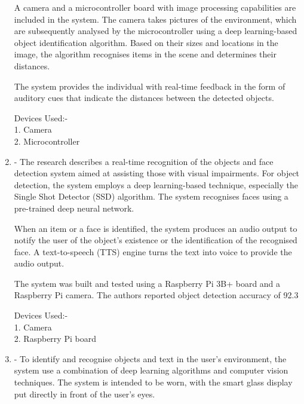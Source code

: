 \documentclass[MScCS]{uccthesis}
\begin{document}
\begin{enumerate}
A camera and a microcontroller board with image processing capabilities are included in the system. The camera takes pictures of the environment, which are subsequently analysed by the microcontroller using a deep learning-based object identification algorithm. Based on their sizes and locations in the image, the algorithm recognises items in the scene and determines their distances.

The system provides the individual with real-time feedback in the form of auditory cues that indicate the distances between the detected objects.

Devices Used:-\\
1. Camera \\
2. Microcontroller





\item \textbf{\Parencite{RTOD}}-  The research describes a real-time recognition of the objects and face detection system aimed at assisting those with visual impairments. For object detection, the system employs a deep learning-based technique, especially the Single Shot Detector (SSD) algorithm. The system recognises faces using a pre-trained deep neural network.

When an item or a face is identified, the system produces an audio output to notify the user of the object's existence or the identification of the recognised face. A text-to-speech (TTS) engine turns the text into voice to provide the audio output.

The system was built and tested using a Raspberry Pi 3B+ board and a Raspberry Pi camera. The authors reported object detection accuracy of 92.3%

Devices Used:-\\
1. Camera\\
2. Raspberry Pi board



\item \textbf{\Parencite{smartglass}}- To identify and recognise objects and text in the user's environment, the system use a combination of deep learning algorithms and computer vision techniques. The system is intended to be worn, with the smart glass display put directly in front of the user's eyes.


\end{enumerate}
\end{document}
